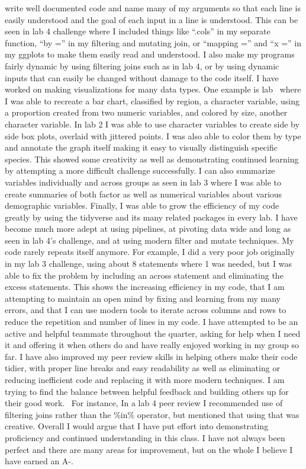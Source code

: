 \documentclass[
  letterpaper,
  DIV=11,
  numbers=noendperiod]{scrartcl}
\begin{document}
write well documented code and name many of my arguments so that each
line is easily understood and the goal of each input in a line is
understood. This can be seen in lab 4 challenge where I included things
like ``.cols'' in my separate function, ``by ='' in my filtering and
mutating join, or ``mapping ='' and ``x ='' in my ggplots to make them
easily read and understood. I also make my programs fairly dynamic by
using filtering joins such as in lab 4, or by using dynamic inputs that
can easily be changed without damage to the code itself. I have worked
on making visualizations for many data types. One example is lab ~where
I was able to recreate a bar chart, classified by region, a character
variable, using a proportion created from two numeric variables, and
colored by size, another character variable. In lab 2 I was able to use
character variables to create side by side box plots, overlaid with
jittered points. I was also able to color them by type and annotate the
graph itself making it easy to visually distinguish specific species.
This showed some creativity as well as demonstrating continued learning
by attempting a more difficult challenge successfully. I can also
summarize variables individually and across groups as seen in lab 3
where I was able to create summaries of both factor as well as numerical
variables about various demographic variables. Finally, I was able to
grow the efficiency of my code greatly by using the tidyverse and its
many related packages in every lab. I have become much more adept at
using pipelines, at pivoting data wide and long as seen in lab 4's
challenge, and at using modern filter and mutate techniques. My code
rarely repeats itself anymore. For example, I did a very poor job
originally in my lab 3 challenge, using about 8 statements where 1 was
needed, but I was able to fix the problem by including an across
statement and eliminating the excess statements. This shows the
increasing efficiency in my code, that I am attempting to maintain an
open mind by fixing and learning from my many errors, and that I can use
modern tools to iterate across columns and rows to reduce the repetition
and number of lines in my code. I have attempted to be an active and
helpful teammate throughout the quarter, asking for help when I need it
and offering it when others do and have really enjoyed working in my
group so far. I have also improved my peer review skills in helping
others make their code tidier, with proper line breaks and easy
readability as well as eliminating or reducing inefficient code and
replacing it with more modern techniques. I am trying to find the
balance between helpful feedback and building others up for their good
work. ~For instance, In a lab 4 peer review I recommended use of
filtering joins rather than the \%in\% operator, but mentioned that
using that was creative. Overall I would argue that I have put effort
into demonstrating proficiency and continued understanding in this
class. I have not always been perfect and there are many areas for
improvement, but on the whole I believe I have earned an A-.
\end{document}
